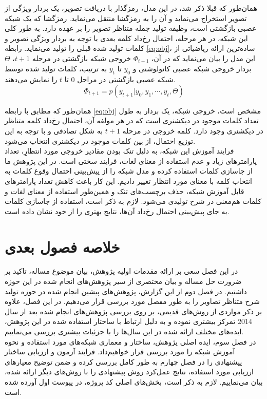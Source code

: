 همان‌طور که قبلا ذکر شد، در این مدل، رمزگذار با دریافت تصویر، یک بردار ویژگی از تصویر استخراج می‌نماید و آن را به رمزگشا منتقل می‌نماید. رمزگشا که یک شبکه عصبی بازگشتی است، وظیفه تولید جمله متناظر تصویر را بر عهده دارد. به طور کلی این شبکه، در هر مرحله، احتمال رخ‌داد کلمه بعدی با توجه به بردار ویژگی تصویر و کلمات تولید شده قبلی را تولید می‌نماید. رابطه \eqref{eq:obj}، ساده‌ترین ارائه ریاضیاتی از این مدل را بیان می‌نماید که در آن، $\Phi_{t+1}$ خروجی شبکه بازگشتی در مرحله $t+1$، $\Theta$ بردار خروجی شبکه عصبی کانولوشنی و $y_0$ تا $y_t$  به ترتیب، کلمات تولید شده توسط شبکه عصبی بازگشتی در مراحل $0$ تا $t$ را نمایش می‌دهند.
\begin{equation}
	\Phi_{t+1} = p(y_{t+1} | y_0, y_1, \cdots, y_t, \Theta)
	\label{eq:obj}
\end{equation}

همان‌طور که مطابق با رابطه \eqref{eq:obj} مشخص است، خروجی شبکه، یک بردار به طول تعداد کلمات موجود در دیکشنری است که در هر مولفه آن، احتمال رخ‌داد کلمه متناظر در دیکشنری وجود دارد. کلمه خروجی در مرحله $t+1$ به شکل تصادفی و با توجه به این توزیع احتمال، از بین کلمات موجود در دیکشنری انتخاب می‌شود.
\\
فرایند آموزش این شبکه، به دلیل تنک بودن مقادیر خروجی مورد انتظارِِِ، تعداد پارامترهای زیاد و عدم استفاده از معنای لغات، فرایند سختی است. در این پژوهش ما از جاسازی کلمات استفاده کرده و مدل شبکه را از پیش‌بینی احتمال وقوع کلمات به انتخاب کلمه با معنای مورد انتظار تغییر دادیم. این کار باعث کاهش تعداد پارامترهای قابل آموزش شبکه، حذف برچسب‌های تنک و همین‌طور استفاده از معنای لغات و کلمات هم‌معنی در شرح تولیدی می‌شود. لازم به ذکر است، استفاده از جاسازی کلمات به جای پیش‌بینی احتمال رخ‌داد آن‌ها، نتایج بهتری را از خود نشان داده است.

\section{خلاصه فصول بعدی}
در این فصل سعی بر ارائه مقدمات اولیه پژوهش، بیان موضوع مساله، تاکید بر ضرورت حل مساله و بیان مختصری از سیر پژوهش‌های انجام شده در این حوزه داشتیم. در فصل‌ دوم از این گزارش، پژوهش‌های پیشین انجام شده در حوزه تولید شرح متناظر تصاویر را به طور مفصل مورد بررسی قرار می‌دهیم. در این فصل، علاوه بر ذکر مواردی از روش‌های قدیمی، بر روی بررسی پژوهش‌های انجام شده بعد از سال 2014 تمرکز بیشتری نموده و به دلیل ارتباط با ساختار استفاده شده در این پژوهش، ایده‌های مختلف ارائه شده در این سال‌ها را با جزئیات بیشتری بررسی می‌نماییم.
\\
در فصل‌ سوم، ایده اصلی پژوهش، ساختار و معماری شبکه‌های مورد استفاده و نحوه آموزش شبکه را مورد بررسی قرار خواهیم‌داد. فرایند آزمون و ارزیابی ساختار پیشنهادی را در فصل چهارم به طور کامل بررسی کرده و ضمن توضیح معیارهای ارزیابی مورد استفاده، نتایج عمل‌کرد روش پیشنهادی را با روش‌های دیگر ارائه شده، بیان می‌نماییم. لازم به ذکر است، بخش‌های اصلی کد پروژه، در پیوست اول آورده شده است.
